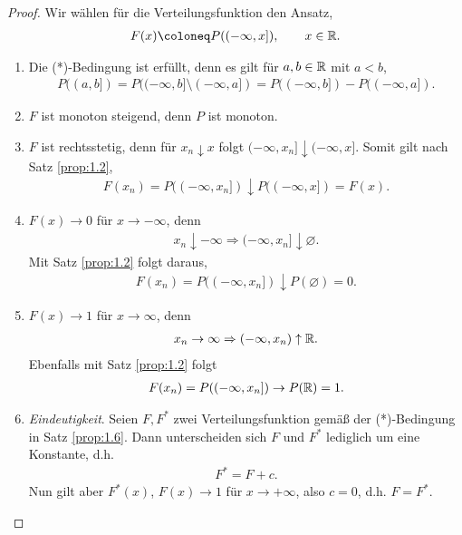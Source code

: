 \begin{proof}
Wir wählen für die Verteilungsfunktion den Ansatz,
\begin{align*}
F(x)\defl P((-\infty,x]),\qquad x\in\R.
\end{align*}
 \begin{enumerate}[label=\arabic{*}.),leftmargin=17pt]
  \item Die (*)-Bedingung ist erfüllt, denn es gilt für $a,b\in\mathbb{R}$ mit $a<b$,
\begin{align*}
P((a,b]) = P((-\infty,b]\setminus(-\infty,a]) = P((-\infty,b])-P((-\infty,a]).
\end{align*}
  \item $F$ ist monoton steigend, denn $P$ ist monoton.
  \item $F$ ist rechtsstetig, denn für $x_n\downarrow x$ folgt
  $(-\infty,x_n]\downarrow (-\infty,x]$. Somit gilt nach Satz \ref{prop:1.2},
\begin{align*}
F(x_n)=P((-\infty,x_n]) \downarrow P((-\infty,x])=F(x).
\end{align*}
\item$F(x)\to 0$ für $x\to -\infty$, denn
\begin{align*}
x_n\downarrow -\infty \Rightarrow (-\infty,x_n]\downarrow \varnothing.
\end{align*}
Mit Satz \ref{prop:1.2} folgt daraus,
\begin{align*}
F(x_n)=P((-\infty,x_n]) \downarrow P(\varnothing) = 0.
\end{align*}
\item $F(x)\to 1$ für $x\to\infty$, denn
\begin{align*}
x_n\to \infty \Rightarrow (-\infty,x_n)\uparrow \mathbb{R}.
\end{align*}
Ebenfalls mit Satz \ref{prop:1.2} folgt
\begin{align*}
F(x_n)=P((-\infty,x_n])\to P(\mathbb{R}) = 1.
\end{align*}
\item \textit{Eindeutigkeit}. Seien $F,F^*$ zwei Verteilungsfunktion gemäß der
(*)-Bedingung in Satz \ref{prop:1.6}. Dann unterscheiden sich $F$ und $F^*$
lediglich um eine Konstante, d.h.
\begin{align*}
F^* = F + c.
\end{align*}
Nun gilt aber $F^*(x)$, $F(x)\to 1$ für $x\to+\infty$, also $c=0$, d.h.
$F=F^*$.\qedhere
\end{enumerate}
\end{proof}

